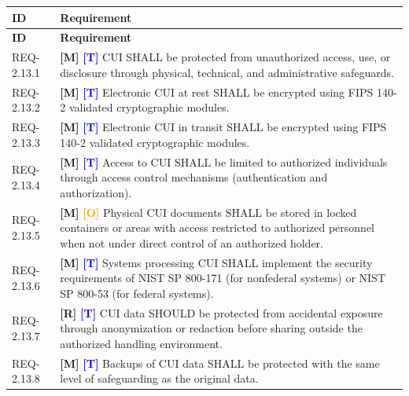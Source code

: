 \documentclass[11pt,letterpaper]{article}
\begin{document}
\begin{longtable}{@{}p{1.4cm}p{11.6cm}@{}}
\toprule
\textbf{ID} & \textbf{Requirement} \\
\midrule
\endfirsthead
\toprule
\textbf{ID} & \textbf{Requirement} \\
\midrule
\endhead

REQ-2.13.1 & \textcolor{mandatory}{\textbf{[M]}} \textcolor{blue}{\textbf{[T]}} CUI SHALL be protected from unauthorized access, use, or disclosure through physical, technical, and administrative safeguards. \\[6pt]

REQ-2.13.2 & \textcolor{mandatory}{\textbf{[M]}} \textcolor{blue}{\textbf{[T]}} Electronic CUI at rest SHALL be encrypted using FIPS 140-2 validated cryptographic modules. \\[6pt]

REQ-2.13.3 & \textcolor{mandatory}{\textbf{[M]}} \textcolor{blue}{\textbf{[T]}} Electronic CUI in transit SHALL be encrypted using FIPS 140-2 validated cryptographic modules. \\[6pt]

REQ-2.13.4 & \textcolor{mandatory}{\textbf{[M]}} \textcolor{blue}{\textbf{[T]}} Access to CUI SHALL be limited to authorized individuals through access control mechanisms (authentication and authorization). \\[6pt]

REQ-2.13.5 & \textcolor{mandatory}{\textbf{[M]}} \textcolor{orange}{\textbf{[O]}} Physical CUI documents SHALL be stored in locked containers or areas with access restricted to authorized personnel when not under direct control of an authorized holder. \\[6pt]

REQ-2.13.6 & \textcolor{mandatory}{\textbf{[M]}} \textcolor{blue}{\textbf{[T]}} Systems processing CUI SHALL implement the security requirements of NIST SP 800-171 (for nonfederal systems) or NIST SP 800-53 (for federal systems). \\[6pt]

REQ-2.13.7 & \textcolor{recommended}{\textbf{[R]}} \textcolor{blue}{\textbf{[T]}} CUI data SHOULD be protected from accidental exposure through anonymization or redaction before sharing outside the authorized handling environment. \\[6pt]

REQ-2.13.8 & \textcolor{mandatory}{\textbf{[M]}} \textcolor{blue}{\textbf{[T]}} Backups of CUI data SHALL be protected with the same level of safeguarding as the original data. \\[6pt]

\bottomrule
\end{longtable}
\end{document}
